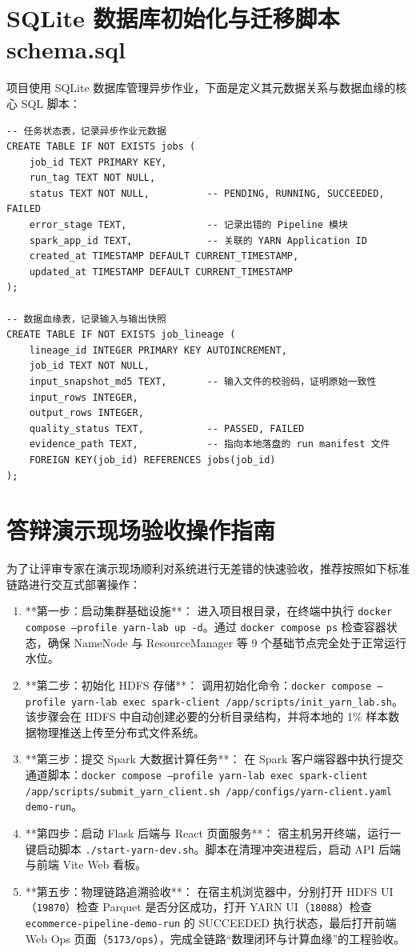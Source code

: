 \section{SQLite 数据库初始化与迁移脚本 schema.sql}

项目使用 SQLite 数据库管理异步作业，下面是定义其元数据关系与数据血缘的核心 SQL 脚本：
\begin{lstlisting}[style=codexcode]
-- 任务状态表，记录异步作业元数据
CREATE TABLE IF NOT EXISTS jobs (
    job_id TEXT PRIMARY KEY,
    run_tag TEXT NOT NULL,
    status TEXT NOT NULL,          -- PENDING, RUNNING, SUCCEEDED, FAILED
    error_stage TEXT,              -- 记录出错的 Pipeline 模块
    spark_app_id TEXT,             -- 关联的 YARN Application ID
    created_at TIMESTAMP DEFAULT CURRENT_TIMESTAMP,
    updated_at TIMESTAMP DEFAULT CURRENT_TIMESTAMP
);

-- 数据血缘表，记录输入与输出快照
CREATE TABLE IF NOT EXISTS job_lineage (
    lineage_id INTEGER PRIMARY KEY AUTOINCREMENT,
    job_id TEXT NOT NULL,
    input_snapshot_md5 TEXT,       -- 输入文件的校验码，证明原始一致性
    input_rows INTEGER,
    output_rows INTEGER,
    quality_status TEXT,           -- PASSED, FAILED
    evidence_path TEXT,            -- 指向本地落盘的 run manifest 文件
    FOREIGN KEY(job_id) REFERENCES jobs(job_id)
);
\end{lstlisting}

\section{答辩演示现场验收操作指南}

为了让评审专家在演示现场顺利对系统进行无差错的快速验收，推荐按照如下标准链路进行交互式部署操作：
\begin{enumerate}
    \item **第一步：启动集群基础设施**：
          进入项目根目录，在终端中执行 \texttt{docker compose --profile yarn-lab up -d}。通过 \texttt{docker compose ps} 检查容器状态，确保 NameNode 与 ResourceManager 等 9 个基础节点完全处于正常运行水位。
    \item **第二步：初始化 HDFS 存储**：
          调用初始化命令：\texttt{docker compose --profile yarn-lab exec spark-client /app/scripts/init\_yarn\_lab.sh}。该步骤会在 HDFS 中自动创建必要的分析目录结构，并将本地的 1\% 样本数据物理推送上传至分布式文件系统。
    \item **第三步：提交 Spark 大数据计算任务**：
          在 Spark 客户端容器中执行提交通道脚本：\texttt{docker compose --profile yarn-lab exec spark-client /app/scripts/submit\_yarn\_client.sh /app/configs/yarn-client.yaml demo-run}。
    \item **第四步：启动 Flask 后端与 React 页面服务**：
          宿主机另开终端，运行一键启动脚本 \texttt{./start-yarn-dev.sh}。脚本在清理冲突进程后，启动 API 后端与前端 Vite Web 看板。
    \item **第五步：物理链路追溯验收**：
          在宿主机浏览器中，分别打开 HDFS UI（\texttt{19870}）检查 Parquet 是否分区成功，打开 YARN UI（\texttt{18088}）检查 \texttt{ecommerce-pipeline-demo-run} 的 SUCCEEDED 执行状态，最后打开前端 Web Ops 页面（\texttt{5173/ops}），完成全链路“数理闭环与计算血缘”的工程验收。
\end{enumerate}
